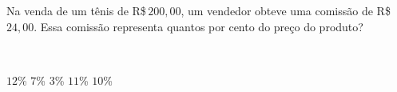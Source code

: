 \parbox{\linewidth}{

Na venda de um tênis de R\$\,$200{,}00$, um vendedor obteve uma comissão de R\$\,$24{,}00$.
Essa comissão representa quantos por cento do preço do produto?}\vspace{2mm}\\\parbox{\linewidth}{

$12$\%
$7$\%
$3$\%
$11$\%
$10$\%

}

